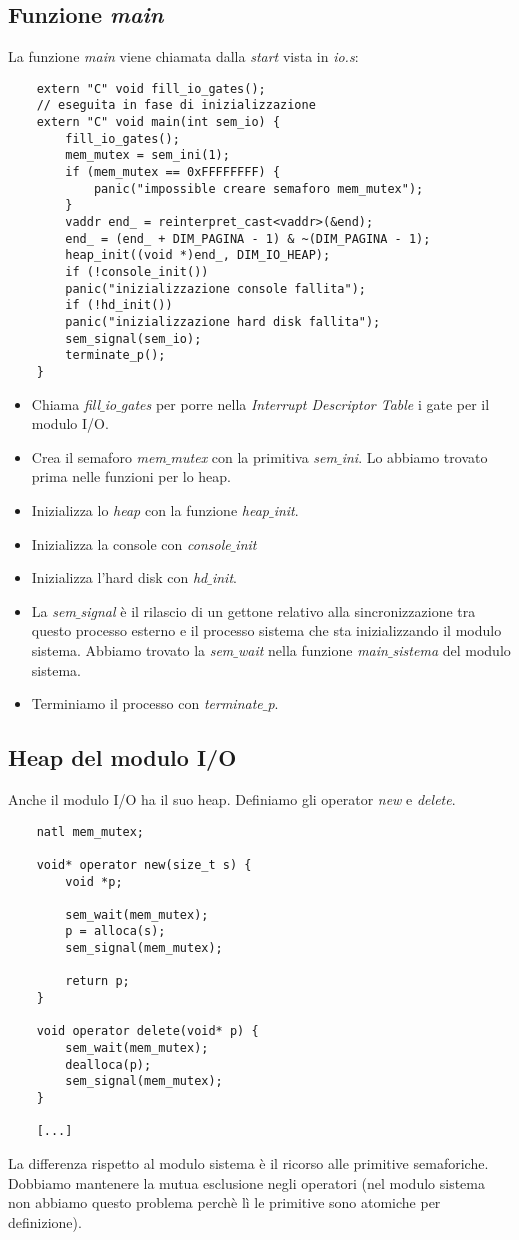 \subsection{Funzione \emph{main}}
La funzione \emph{main} viene chiamata dalla \emph{start} vista in \emph{io.s}:
\small
\begin{verbatim}
	extern "C" void fill_io_gates();
	// eseguita in fase di inizializzazione
	extern "C" void main(int sem_io) {	
		fill_io_gates();
		mem_mutex = sem_ini(1);
		if (mem_mutex == 0xFFFFFFFF) {
			panic("impossible creare semaforo mem_mutex");
		}
		vaddr end_ = reinterpret_cast<vaddr>(&end);
		end_ = (end_ + DIM_PAGINA - 1) & ~(DIM_PAGINA - 1);
		heap_init((void *)end_, DIM_IO_HEAP);
		if (!console_init())
		panic("inizializzazione console fallita");
		if (!hd_init())
		panic("inizializzazione hard disk fallita");
		sem_signal(sem_io);
		terminate_p();
	}
\end{verbatim}
\normalsize 
\begin{itemize}
	\item Chiama \emph{fill$\_$io$\_$gates} per porre nella \emph{Interrupt Descriptor Table} i gate per il modulo I/O.
	\item Crea il semaforo \emph{mem$\_$mutex} con la primitiva \emph{sem$\_$ini}. Lo abbiamo trovato prima nelle funzioni per lo heap.
	\item Inizializza lo \emph{heap} con la funzione \emph{heap$\_$init}.
	\item Inizializza la console con \emph{console$\_$init}
	\item Inizializza l'hard disk con \emph{hd$\_$init}.
	\item La \emph{sem$\_$signal} è il rilascio di un gettone relativo alla sincronizzazione tra questo processo esterno e il processo sistema che sta inizializzando il modulo sistema. Abbiamo trovato la \emph{sem$\_$wait} nella funzione \emph{main$\_$sistema} del modulo sistema.
	\item Terminiamo il processo con \emph{terminate$\_$p}.
\end{itemize}


\subsection{Heap del modulo I/O}
Anche il modulo I/O ha il suo heap. Definiamo gli operator \emph{new} e \emph{delete}.
\small 
\begin{verbatim}
	natl mem_mutex;
	
	void* operator new(size_t s) {
		void *p;
		
		sem_wait(mem_mutex);
		p = alloca(s);
		sem_signal(mem_mutex);
		
		return p;
	}
	
	void operator delete(void* p) {
		sem_wait(mem_mutex);
		dealloca(p);
		sem_signal(mem_mutex);
	}
	
	[...]
\end{verbatim}
\normalsize 
La differenza rispetto al modulo sistema è il ricorso alle primitive semaforiche. Dobbiamo mantenere la mutua esclusione negli operatori (nel modulo sistema non abbiamo questo problema perchè lì le primitive sono atomiche per definizione).  